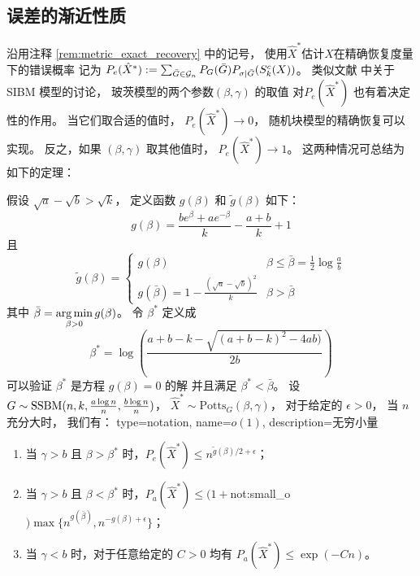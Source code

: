 \subsection{误差的渐近性质}
沿用注释 \ref{rem:metric_exact_recovery} 中的记号，
使用$\hat{X}^*$估计$X$在精确恢复度量下的错误概率
记为 $P_e(\hat{X}^*) := \sum_{\bar{G} \in \mathcal{G}_n} P_G(\bar{G}) P_{\sigma | \bar{G}}(S^c_k(X))$。
类似文献  中关于 SIBM 模型的讨论，
玻茨模型的两个参数$(\beta, \gamma)$ 的取值
对$P_e(\hat{X}^*)$
也有着决定性的作用。
当它们取合适的值时， 
$ P_e(\hat{X}^*)\to 0$，
随机块模型的精确恢复可以实现。
反之，如果 $(\beta, \gamma)$ 取其他值时，
$P_e(\hat{X}^*) \to 1$。
这两种情况可总结为如下的定理：

\begin{theorem}\label{thm:phase_transition}
	假设 $\sqrt{a} - \sqrt{b} > \sqrt{k}$，
	定义函数 $g(\beta)$ 和 $ \tilde{g}(\beta)$ 如下：
	\begin{equation}
		\label{eq:g_beta_main_article}
		g(\beta) = \frac{be^{\beta} + a e^{-\beta}}{k} - \frac{a+b}{k} +1
	\end{equation}
	且
	\begin{equation}
		\label{eq:g_tilde_beta_main_article}
	\tilde{g}(\beta) = \begin{cases}
	g(\beta) & \beta \leq \bar{\beta} = \frac{1}{2}\log \frac{a}{b} \\
	g(\bar{\beta}) = 1 - \frac{\left(\sqrt{a} - \sqrt{b}\right)^2}{k} & \beta > \bar{\beta}
	\end{cases}
	\end{equation}
	其中
	$\bar{\beta} =  \displaystyle\operatorname*{arg\,min}_{\beta > 0} g(\beta)$。
	令 $\beta^*$ 定义成
	\begin{equation}\label{eq:beta_star}
	\beta^* = \log\left(\frac{a + b - k - \sqrt{(a + b - k)^2 - 4 a b)}}{2  b}\right)
	\end{equation}
	可以验证 $\beta^*$ 是方程 $g(\beta) = 0$ 的解 并且满足  $\beta^* < \bar{\beta}$。	
	设 $G\sim \operatorname{SSBM}(n, k, \frac{a \log n}{n}, \frac{b \log n}{n})$， $\hat{X}^* \sim \textrm{Potts}_G(\beta, \gamma)$，
	对于给定的 $\epsilon > 0$， 当 $n$ 充分大时， 我们有：
	{
	  type=notation,
	  name={$o(1)$},
	  description={无穷小量}
	}
	\begin{enumerate}
	\item 当 $\gamma > b$ 且 $\beta > \beta^*$ 时，$P_e(\hat{X}^*) \leq n^{\tilde{g}(\beta)/2 + \epsilon}$；
	\item 当 $\gamma > b$ 且 $\beta < \beta^*$ 时，$P_a(\hat{X}^*) \leq (1+$\gls{not:small_o}$)\max\{n^{g(\bar{\beta})}, n^{-g(\beta) + \epsilon}\}$；
	\item 当 $\gamma < b$ 时，对于任意给定的 $C>0$	均有 $P_a(\hat{X}^*) \leq \exp(-C n)$。
	\end{enumerate}
\end{theorem}

